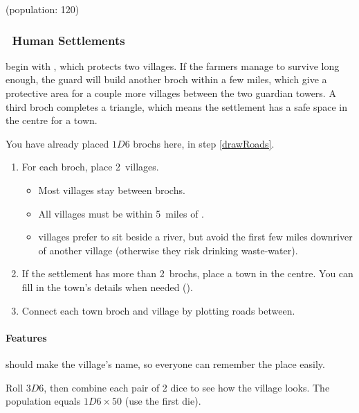 \begin{multicols}{2}
\begin{dlist}
  (population: 120)
\end{dlist}

\subsubsection[Human Settlements]{\Hu\ Human Settlements}
\label{humanPoint}
begin with , which protects two \glspl{village}.
If the farmers manage to survive long enough, the \gls{guard} will build another \gls{broch} within a few miles, which give a protective area for a couple more \glspl{village} between the two guardian towers.
A third \gls{broch} completes a triangle, which means the settlement has a safe space in the centre for a town.

You have already placed $1D6$ \glspl{broch} here, in step \vref{drawRoads}.

\begin{enumerate}
  \item
  For each \gls{broch}, place 2~\glspl{village}.
  \begin{itemize}
    \item
    Most \glspl{village} stay between \glspl{broch}.
    \item
    All \glspl{village} must be within 5~miles of .
    \item
    \Glspl{village} prefer to sit beside a river, but avoid the first few miles downriver of another \gls{village} (otherwise they risk drinking waste-water).
  \end{itemize}
  \item
  If the settlement has more than 2~\glspl{broch}, place a town in the centre.
  You can fill in the town's details when needed ().
  \item
  Connect each town \gls{broch} and \gls{village} by plotting roads between.
\end{enumerate}

\paragraph{ Features}
\label{villageFeatures}
should make the \gls{village}'s name, so everyone can remember the place easily.

Roll $3D6$, then combine each pair of 2 dice to see how the \gls{village} looks.
The population equals $1D6 \times 50$ (use the first die).

\encVillageFeatures


\end{multicols}
